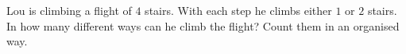 Lou is climbing a flight of $4$ stairs. With each step he climbs either $1$ or $2$ stairs. In how many different ways can he climb the flight? Count them in an organised way.
